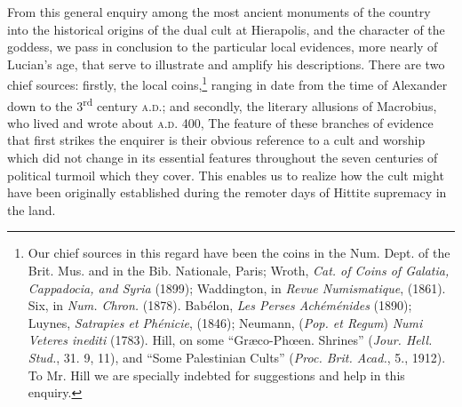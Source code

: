 \documentclass[a4paper, 11pt, oneside, polutonikogreek, english]{article}
\begin{document}
From this general enquiry among the most ancient monuments of the country into the historical origins of the dual cult at Hierapolis, and the character of the goddess, we pass in conclusion to the particular local evidences, more nearly of Lucian's age, that serve to illustrate and amplify his descriptions. There are two chief sources: firstly, the local coins,\footnote{Our chief sources in this regard have been the coins in the Num. Dept. of the Brit. Mus. and in the Bib. Nationale, Paris; Wroth, \emph{Cat. of Coins of Galatia, Cappadocia, and Syria} (1899); Waddington, in \emph{Revue Numismatique}, (1861). Six, in \emph{Num. Chron.} (1878).  Babélon, \emph{Les Perses Achéménides} (1890); Luynes, \emph{Satrapies et Phénicie}, (1846); Neumann, (\emph{Pop. et Regum}) \emph{Numi Veteres inediti} (1783). Hill, on some ``Græco-Phœen. Shrines'' (\emph{Jour. Hell. Stud.}, 31. 9, 11), and ``Some Palestinian Cults'' (\emph{Proc. Brit. Acad.}, 5., 1912). To Mr. Hill we are specially indebted for suggestions and help in this enquiry.} ranging in date from the time of Alexander down to the 3\textsuperscript{rd} century \textsc{a.d.}; and secondly, the literary allusions of Macrobius, who lived and wrote about \textsc{a.d.} 400, The feature of these branches of evidence that first strikes the enquirer is their obvious reference to a cult and worship which did not change in its essential features throughout the seven centuries of political turmoil which they cover. This enables us to realize how the cult might have been originally established during the remoter days of Hittite supremacy in the land.
\end{document}
